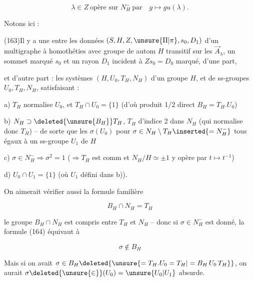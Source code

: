 \[
\lambda\in Z\ \text{opère sur }N_H^-\ \text{par}\quad g\longmapsto gu(\lambda).\tag*{(162)}
\]

Notons ici :


(163)\quad Il y a une  entre les données $(S,H,Z,\unsure{\Pi|\pi},s_0,D_1)$ d'un multigraphe à homothéties avec groupe de autom $H$  transitif sur les $\overrightarrow A_\lambda$, un sommet marqué $s_0$ et un rayon $D_1$ incident à $Zs_0=D_0$ marqué,  d'une part,

et d'autre part : les systèmes $(H,U_0,T_H,N_H)$ d'un groupe $H$, et de ss-groupes $U_0,T_H,N_H$, satisfaisant :

a) $T_H$ normalise $U_0$, et $T_H\cap U_0=\{1\}$ (d'où produit 1/2 direct $B_H=T_H.U_0$)

b) $N_H\supset\deleted{\unsure{B_H}}T_H$, $T_H$ d'indice  2 dans $N_H$ (qui normalise donc $T_H$) -- de sorte que les $\sigma(U_0)$ pour $\sigma\in N_H\setminus T_H\inserted{=N_H^-}$  tous égaux à un  ss-groupe $U_1$ de $H$

c)  $\sigma\in N_H^-\Longrightarrow\sigma^2=1$ ($\Rightarrow T_H$ est comm et $N_H/H\simeq\pm1$ y opère par $t\mapsto t^{-1}$)

d) $U_0\cap U_1=\{1\}$ (où $U_1$ défini dans b)).

On aimerait vérifier aussi la formule familière

\[
B_H\cap N_H=T_H\tag*{(164)}
\]


 le groupe $B_H\cap N_H$ est compris entre $T_H$ et $N_H$ -- donc si $\sigma\in N_H^-$ est donné, la formule (164) équivaut à

\[
\sigma\notin B_H\tag*{(165)}
\]

Mais si on avait $\sigma\in B_H\deleted{\unsure{=T_H.U_0=T_H|=B_H\,U_0\,T_H}}$, on aurait $\sigma\deleted{\unsure{\in}}(U_0)=\unsure{U_0|U_1}$  absurde.

